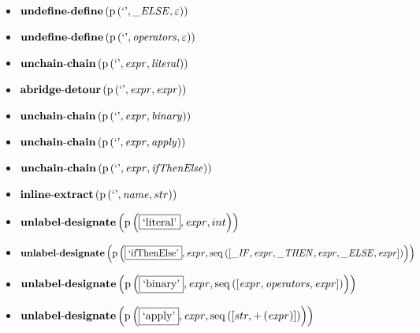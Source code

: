 {\begin{itemize}
\item $\mathbf{undefine\text{-}define}\\\left(\mathrm{p}\left(\text{`'},\mathit{\_ ELSE},\varepsilon\right)\right)$
\item $\mathbf{undefine\text{-}define}\\\left(\mathrm{p}\left(\text{`'},\mathit{operators},\varepsilon\right)\right)$
\item $\mathbf{unchain\text{-}chain}\\\left(\mathrm{p}\left(\text{`'},\mathit{expr},\mathit{literal}\right)\right)$
\item $\mathbf{abridge\text{-}detour}\\\left(\mathrm{p}\left(\text{`'},\mathit{expr},\mathit{expr}\right)\right)$
\item $\mathbf{unchain\text{-}chain}\\\left(\mathrm{p}\left(\text{`'},\mathit{expr},\mathit{binary}\right)\right)$
\item $\mathbf{unchain\text{-}chain}\\\left(\mathrm{p}\left(\text{`'},\mathit{expr},\mathit{apply}\right)\right)$
\item $\mathbf{unchain\text{-}chain}\\\left(\mathrm{p}\left(\text{`'},\mathit{expr},\mathit{ifThenElse}\right)\right)$
\item $\mathbf{inline\text{-}extract}\\\left(\mathrm{p}\left(\text{`'},\mathit{name},str\right)\right)$
\item $\mathbf{unlabel\text{-}designate}\\\left(\mathrm{p}\left(\fbox{\text{`literal'}},\mathit{expr},int\right)\right)$
\item $\mathbf{unlabel\text{-}designate}\\\left(\mathrm{p}\left(\fbox{\text{`ifThenElse'}},\mathit{expr},\mathrm{seq}\left(\left[\mathit{\_ IF}, \mathit{expr}, \mathit{\_ THEN}, \mathit{expr}, \mathit{\_ ELSE}, \mathit{expr}\right]\right)\right)\right)$
\item $\mathbf{unlabel\text{-}designate}\\\left(\mathrm{p}\left(\fbox{\text{`binary'}},\mathit{expr},\mathrm{seq}\left(\left[\mathit{expr}, \mathit{operators}, \mathit{expr}\right]\right)\right)\right)$
\item $\mathbf{unlabel\text{-}designate}\\\left(\mathrm{p}\left(\fbox{\text{`apply'}},\mathit{expr},\mathrm{seq}\left(\left[str, {+}\left(\mathit{expr}\right)\right]\right)\right)\right)$

\end{itemize}}
